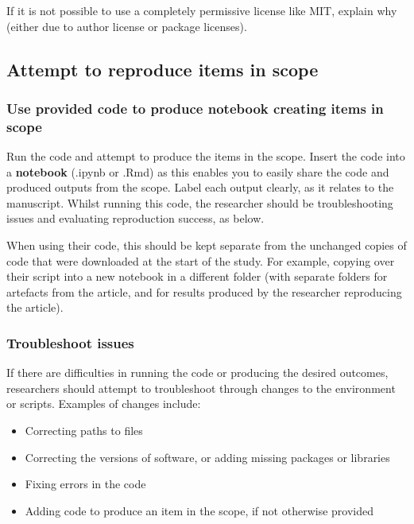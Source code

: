 If it is not possible to use a completely permissive license like MIT, explain why (either due to author license or package licenses).

\subsection{Attempt to reproduce items in scope}

\subsubsection{Use provided code to produce notebook creating items in scope}

Run the code and attempt to produce the items in the scope. Insert the code into a \textbf{notebook} (.ipynb or .Rmd) as this enables you to easily share the code and produced outputs from the scope. Label each output clearly, as it relates to the manuscript. Whilst running this code, the researcher should be troubleshooting issues and evaluating reproduction success, as below.

When using their code, this should be kept separate from the unchanged copies of code that were downloaded at the start of the study. For example, copying over their script into a new notebook in a different folder (with separate folders for artefacts from the article, and for results produced by the researcher reproducing the article).

\subsubsection{Troubleshoot issues}

If there are difficulties in running the code or producing the desired outcomes, researchers should attempt to troubleshoot through changes to the environment or scripts. Examples of changes include:
\begin{itemize}
    \item Correcting paths to files
    \item Correcting the versions of software, or adding missing packages or libraries
    \item Fixing errors in the code
    \item Adding code to produce an item in the scope, if not otherwise provided
\end{itemize}

